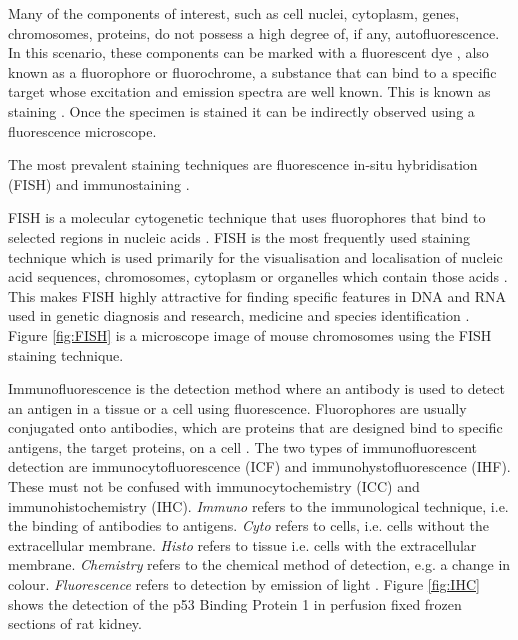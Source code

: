 Many of the components of interest, such as cell nuclei, cytoplasm, genes, chromosomes, proteins, do not possess a high degree of, if any,  autofluorescence. 
In this scenario, these components can be marked with a fluorescent dye \citep{Tsien1998}, also known as a fluorophore or fluorochrome, a substance that can bind to a specific target whose excitation and emission spectra are well known. 
This is known as staining \citep{Danek2012,Hubeny2008,Dobrucki2013}. 
Once the specimen is stained it can be indirectly observed using a fluorescence microscope.

The most prevalent staining techniques are fluorescence in-situ hybridisation (FISH) and immunostaining \citep{Danek2012,Fatima2008,Kozubek2001_2,Theodosiou2007}.

\begin{definition}
	FISH is a molecular cytogenetic technique that uses fluorophores that bind to selected regions in nucleic acids \citep{Danek2012,Fatima2008}.
	FISH is the most frequently used staining technique which is used primarily for the  visualisation and localisation of nucleic acid sequences, chromosomes, cytoplasm or organelles which contain those acids \citep{Hubeny2008}.
	This makes FISH highly attractive for finding specific features in DNA and RNA used in genetic diagnosis and research, medicine and species identification \citep{Amann2008,Fatima2008}.
	Figure \ref{fig:FISH} is a microscope image of mouse chromosomes using the FISH staining technique.
\end{definition}

\begin{definition}[Immunostaining]
	Immunofluorescence is the detection method where an antibody is used to detect an antigen in a tissue or a cell using fluorescence. Fluorophores are usually conjugated onto antibodies, which are proteins that are designed bind to specific antigens, the target proteins, on a cell \citep{CudeBurke2014}.
	The two types of immunofluorescent detection are immunocytofluorescence (ICF) and immunohystofluorescence (IHF).
	These must not be confused with immunocytochemistry (ICC) and immunohistochemistry (IHC).
	\textit{Immuno} refers to the immunological technique, i.e. the binding of antibodies to antigens.
	\textit{Cyto} refers to cells, i.e. cells without the extracellular membrane.
	\textit{Histo} refers to tissue i.e. cells with the extracellular membrane.
	\textit{Chemistry} refers to the chemical method of detection, e.g. a change in colour.
	\textit{Fluorescence} refers to detection by emission of light \citep{Katikireddy2011}.
	Figure \ref{fig:IHC} shows the detection of the p53 Binding Protein 1 in perfusion fixed frozen sections of rat kidney.
\end{definition}


